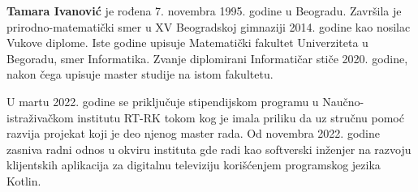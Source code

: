 \documentclass[12pt,oneside]{memoir}
\begin{document}
\begin{biografija}
  \textbf{Tamara Ivanović} je rođena 7. novembra 1995. godine u Beogradu. Završila je prirodno-matematički smer u XV Beogradskoj gimnaziji 2014. godine kao nosilac Vukove diplome. Iste godine upisuje Matematički fakultet Univerziteta u Begoradu, smer Informatika. Zvanje diplomirani Informatičar stiče 2020. godine, nakon čega upisuje master studije na istom fakultetu. 
  
  U martu 2022. godine se priključuje stipendijskom programu u Naučno-istraživačkom institutu RT-RK tokom kog je imala priliku da uz stručnu pomoć razvija projekat koji je deo njenog master rada. Od novembra 2022. godine zasniva radni odnos u okviru instituta gde radi kao softverski inženjer na razvoju klijentskih aplikacija za digitalnu televiziju korišćenjem programskog jezika Kotlin. 
\end{biografija}
\end{document}
